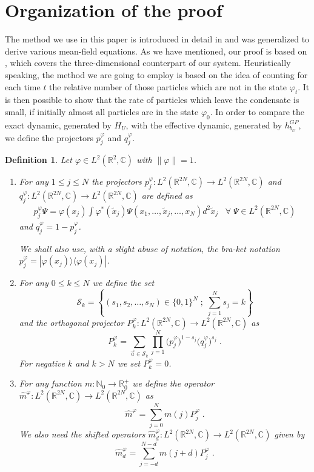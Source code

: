 \documentclass[11pt, english, american]{article}
\newcommand{\be}{\begin{equation}}
\newcommand{\ee}{\end{equation}}
\newcommand{\LZN}{L^2(\mathbb{R}^{2N},\mathbb{C})}
\newtheorem{definition}[theorem] {Definition}
\renewcommand{\phi}{\varphi}
\begin{document}
\section{Organization of the proof}\label{secskel}


The method we  use in this paper is introduced in detail in  \cite{pickl1} and was generalized to derive various mean-field equations. 
As we have mentioned, our proof is based on \cite{picklgp3d}, which covers the three-dimensional counterpart of our system.
Heuristically speaking, the method we are going to employ is based on the idea of counting for each time $t$ the relative number of those particles which are
not in the state $\phi_t$. 
It is then possible to show that the rate of particles which leave the condensate is small, if initially almost all particles are in the state $\phi_0$.  
In order to compare the exact dynamic, generated by $H_U$, with the effective dynamic, generated by $h^{GP}_{b_U}$, we define the projectors $p^\phi_j$ and $q^\phi_j$.
\begin{definition}\label{defpro}
Let $\phi\in L^{2}(\mathbb{R}^2,\mathbb{C})$ with $\| \phi  \|=1$.
\begin{enumerate}
\item For any $1\leq  j\leq  N$ the
projectors $p_j^\phi:\LZN\to\LZN$ and $q_j^\phi:\LZN\to\LZN$ are defined as
\begin{align*} p_j^\phi\Psi=\phi(x_j)\int\phi^*(\tilde{x}_j)\Psi(x_1,\ldots, \tilde{x}_j,\dots,x_N)d^2\tilde{x}_j\;\;\;\forall\;\Psi\in\LZN
\end{align*}
and $q_j^\phi=1-p_j^\phi$.

We shall also use, with a slight abuse of notation, the bra-ket notation
$p_j^\phi=|\phi(x_j)\rangle\langle\phi(x_j)|$.
\item 
For any $0\leq  k\leq  N$ we define the set 
$$
\mathcal{S}_k=\left\lbrace (s_1,s_2,\ldots,s_N)\in\{0,1\}^N\;;\;
\sum_{j=1}^N s_j=k\right\rbrace
$$ 
and the orthogonal projector $P_{k}^\phi:\LZN \rightarrow \LZN$ as
$$P_{k}^\phi=\sum_{\vec a\in\mathcal{S}_k}\prod_{j=1}^N\big(p_{j}^{\phi}\big)^{1-s_j} \big(q_{j}^{\phi}\big)^{s_j}\;.$$
For
negative $k$ and $k>N$ we set $P_{k}^\phi=0$.
\item
For any function $m:\mathbb{N}_0\to\mathbb{R}^+_0$ we define the operator $\widehat{m}^{\phi}:\LZN\to\LZN$ as
\be\label{hut}\widehat{m}^{\phi}=\sum_{j=0}^N m(j)P_j^\phi\;.\ee
We also need the shifted operators
$\widehat{m}^{\phi}_d:\LZN\to\LZN$ given by
$$\widehat{m}^{\phi}_d=\sum_{j=-d}^{N-d} m(j+d)P_j^\phi\;.$$
\end{enumerate}
\end{definition}
\end{document}

